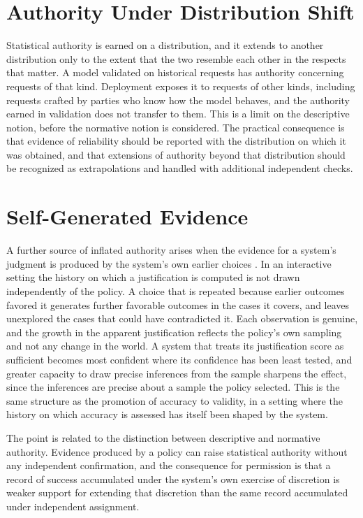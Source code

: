 \section{Authority Under Distribution Shift}

Statistical authority is earned on a distribution, and it extends to another distribution only to the extent that the two resemble each other in the respects that matter. A model validated on historical requests has authority concerning requests of that kind. Deployment exposes it to requests of other kinds, including requests crafted by parties who know how the model behaves, and the authority earned in validation does not transfer to them. This is a limit on the descriptive notion, before the normative notion is considered. The practical consequence is that evidence of reliability should be reported with the distribution on which it was obtained, and that extensions of authority beyond that distribution should be recognized as extrapolations and handled with additional independent checks.

\section{Self-Generated Evidence}

A further source of inflated authority arises when the evidence for a system's judgment is produced by the system's own earlier choices \cite{flyxion2026}. In an interactive setting the history on which a justification is computed is not drawn independently of the policy. A choice that is repeated because earlier outcomes favored it generates further favorable outcomes in the cases it covers, and leaves unexplored the cases that could have contradicted it. Each observation is genuine, and the growth in the apparent justification reflects the policy's own sampling and not any change in the world. A system that treats its justification score as sufficient becomes most confident where its confidence has been least tested, and greater capacity to draw precise inferences from the sample sharpens the effect, since the inferences are precise about a sample the policy selected. This is the same structure as the promotion of accuracy to validity, in a setting where the history on which accuracy is assessed has itself been shaped by the system.

The point is related to the distinction between descriptive and normative authority. Evidence produced by a policy can raise statistical authority without any independent confirmation, and the consequence for permission is that a record of success accumulated under the system's own exercise of discretion is weaker support for extending that discretion than the same record accumulated under independent assignment.

